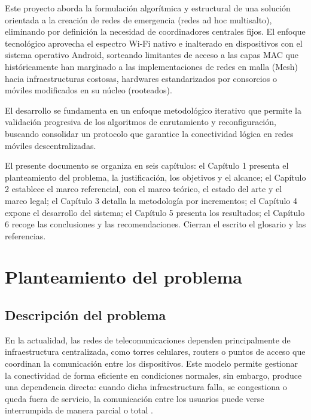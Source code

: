 \documentclass[12pt,oneside]{scrreprt}
\begin{document}
Este proyecto aborda la formulación algorítmica y estructural de una solución orientada a la creación de redes de emergencia (redes ad hoc multisalto), eliminando por definición la necesidad de coordinadores centrales fijos. El enfoque tecnológico aprovecha el espectro Wi-Fi nativo e inalterado en dispositivos con el sistema operativo Android, sorteando limitantes de acceso a las capas MAC que históricamente han marginado a las implementaciones de redes en malla (Mesh) hacia infraestructuras costosas, hardwares estandarizados por consorcios o móviles modificados en su núcleo (rooteados).

El desarrollo se fundamenta en un enfoque metodológico iterativo que permite la validación progresiva de los algoritmos de enrutamiento y reconfiguración, buscando consolidar un protocolo que garantice la conectividad lógica en redes móviles descentralizadas.

El presente documento se organiza en seis capítulos: el Capítulo 1 presenta el planteamiento del problema, la justificación, los objetivos y el alcance; el Capítulo 2 establece el marco referencial, con el marco teórico, el estado del arte y el marco legal; el Capítulo 3 detalla la metodología por incrementos; el Capítulo 4 expone el desarrollo del sistema; el Capítulo 5 presenta los resultados; el Capítulo 6 recoge las conclusiones y las recomendaciones. Cierran el escrito el glosario y las referencias.

\chapter{Planteamiento del problema}

\section{Descripción del problema}

En la actualidad, las redes de telecomunicaciones dependen principalmente de infraestructura centralizada, como torres celulares, routers o puntos de acceso que coordinan la comunicación entre los dispositivos. Este modelo permite gestionar la conectividad de forma eficiente en condiciones normales, sin embargo, produce una dependencia directa: cuando dicha infraestructura falla, se congestiona o queda fuera de servicio, la comunicación entre los usuarios puede verse interrumpida de manera parcial o total \parencite{Tanenbaum2011}.
\end{document}
